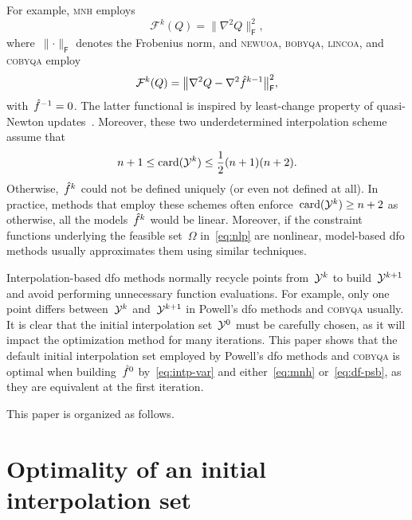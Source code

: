 \documentclass[draft]{article}
\numberwithin{equation}{section}
\theoremstyle{definition}
\DeclareMathOperator{\card}{card}
\newcommand{\fset}{\Omega}
\newcommand{\norm}[2][]{#1\lVert#2#1\rVert}
\newcommand{\obj}{f}
\newcommand{\objm}[1][]{\hat{\obj}\ifblank{#1}{}{^{#1}}}
\newcommand{\solvername}[1]{\textsc{#1}\xspace}
\newcommand{\xpt}[1][]{\mathcal{Y}\ifblank{#1}{}{^{#1}}}
\begin{document}
For example, \solvername{mnh} employs
\begin{equation}
    \label{eq:mnh}
    \mathcal{F}^k(Q) = \norm[\big]{\nabla^2 Q}_{\mathsf{F}}^2,
\end{equation}
where~$\norm{\cdot}_{\mathsf{F}}$ denotes the Frobenius norm, and \solvername{newuoa}, \solvername{bobyqa}, \solvername{lincoa}, and \solvername{cobyqa} employ
\begin{equation}
    \label{eq:df-psb}
    \mathcal{F}^k(Q) = \norm[\big]{\nabla^2 Q - \nabla^2 \objm[k - 1]}_{\mathsf{F}}^2,
\end{equation}
with~$\objm[-1] = 0$.
The latter functional is inspired by least-change property of quasi-Newton updates~\cite{Dennis_Schnabel_1979}.
Moreover, these two underdetermined interpolation scheme assume that
\begin{equation*}
    n + 1 \le \card(\xpt[k]) \le \frac{1}{2} (n + 1) (n + 2).
\end{equation*}
Otherwise,~$\objm[k]$ could not be defined uniquely (or even not defined at all).
In practice, methods that employ these schemes often enforce~$\card(\xpt[k]) \ge n + 2$ as otherwise, all the models~$\objm[k]$ would be linear.
Moreover, if the constraint functions underlying the feasible set~$\fset$ in~\eqref{eq:nlp} are nonlinear, model-based \gls{dfo} methods usually approximates them using similar techniques.

Interpolation-based \gls{dfo} methods normally recycle points from~$\xpt[k]$ to build~$\xpt[k + 1]$ and avoid performing unnecessary function evaluations.
For example, only one point differs between~$\xpt[k]$ and~$\xpt[k + 1]$ in Powell's \gls{dfo} methods and \solvername{cobyqa} usually.
It is clear that the initial interpolation set~$\xpt[0]$ must be carefully chosen, as it will impact the optimization method for many iterations.
This paper shows that the default initial interpolation set employed by Powell's \gls{dfo} methods and \solvername{cobyqa} is optimal when building~$\objm[0]$ by~\eqref{eq:intp-var} and either~\eqref{eq:mnh} or~\eqref{eq:df-psb}, as they are equivalent at the first iteration.

This paper is organized as follows.

\section{Optimality of an initial interpolation set}
\end{document}
